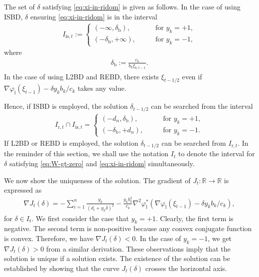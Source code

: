 \documentclass[10pt,onecolumn]{article}
\theoremstyle{definition}
\theoremstyle{definition}
\theoremstyle{definition}
\theoremstyle{definition}
\theoremstyle{definition}
\theoremstyle{theorem}
\newcommand{\0}{{\bm{0}}}
\newcommand{\1}{{\bm{1}}}
\newcommand{\bR}{{\mathbb{R}}}
\begin{document}
The set of $\delta$ satisfying \eqref{eq:xi-in-ridom} is given
as follows.  In the case of using ISBD,
$\delta$ ensuring \eqref{eq:xi-in-ridom} is in
the interval
\begin{align*}
I_{\text{is},t} :=
\begin{cases}
( -\infty, \delta_{\text{b}} ), &\qquad \text{for $y_{k}=+1$},
\\
( -\delta_{\text{b}}, +\infty ), &\qquad \text{for $y_{k}=-1$},
\end{cases}
\end{align*}
where
\begin{align*}
  \delta_{\text{b}} := \frac{c_{k}}{b_{k}\xi_{k,t-1}}.
\end{align*}
In the case of using L2BD and REBD, there exists $\xi_{t-1/2}$ even if
$\nabla\varphi_{\text{l}}(\xi_{t-1}) - \delta y_{k}b_{k}/c_{k}$ takes any value.

Hence, if ISBD is employed, the solution $\delta_{t-1/2}$ can be searched
from the interval
\begin{align*}
  I_{\text{r},t}\cap I_{\text{is},t} =
\begin{cases}
( -d_{n}, \delta_{\text{b}} ), &\qquad \text{for $y_{k}=+1$},
\\
( -\delta_{\text{b}}, +d_{n} ), &\qquad \text{for $y_{k}=-1$}.
\end{cases}
\end{align*}
If L2BD or REBD is employed,
the solution $\delta_{t-1/2}$ can be searched from $I_{\text{r},t}$.
In the reminder of this section, we shall use the notation $I_{t}$ to
denote the interval for $\delta$ satisfying \eqref{eq:W-gt-zero}
and \eqref{eq:xi-in-ridom} simultaneously.

We now show the uniqueness of the solution. The gradient of $J_{t}:\bR\to\bR$
is expressed as
\begin{align*}
  \nabla J_{t}(\delta)
  =
  -\sum_{i=1}^{n}\frac{y_{k}}{(d_{i}+y_{k}\delta)^{2}}
  -\frac{y_{k}b_{k}^{2}}{c_{k}}
  \nabla^{2}\varphi^{*}_{\text{l}}
  (\nabla\varphi_{\text{l}}(\xi_{t-1}) - \delta y_{k}b_{k}/c_{k}),
\end{align*}
for $\delta\in I_{t}$.  We first consider the case that
$y_{k}=+1$. Clearly, the first term is negative.
The second term is non-positive because any convex conjugate function
is convex. Therefore, we have $\nabla J_{t}(\delta) < 0$.
In the case of $y_{k}=-1$,
we get $\nabla J_{t}(\delta) > 0$ from a similar derivation.
These observations imply that the solution is unique
if a solution exists.  The existence of the solution can be
established by showing that the curve $J_{t}(\delta)$ crosses
the horizontal axis.
\end{document}
